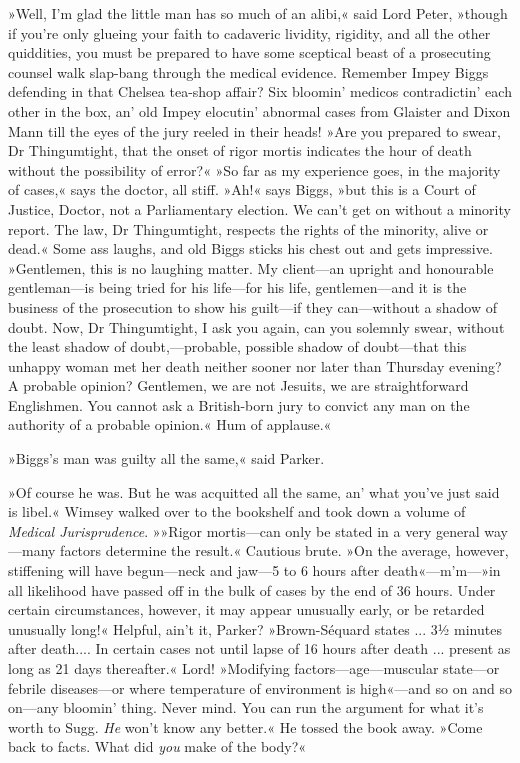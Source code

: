 »Well, I'm glad the little man has so much of an alibi,« said Lord Peter, »though if you're only glueing your faith to cadaveric lividity, rigidity, and all the other quiddities, you must be prepared to have some sceptical beast of a prosecuting counsel walk slap-bang through the medical evidence. Remember Impey Biggs defending in that Chelsea tea-shop affair? Six bloomin' medicos contradictin' each other in the box, an' old Impey elocutin' abnormal cases from Glaister and Dixon Mann till the eyes of the jury reeled in their heads! »Are you prepared to swear, Dr Thingumtight, that the onset of rigor mortis indicates the hour of death without the possibility of error?« »So far as my experience goes, in the majority of cases,« says the doctor, all stiff. »Ah!« says Biggs, »but this is a Court of Justice, Doctor, not a Parliamentary election. We can't get on without a minority report. The law, Dr Thingumtight, respects the rights of the minority, alive or dead.« Some ass laughs, and old Biggs sticks his chest out and gets impressive. »Gentlemen, this is no laughing matter. My client—an upright and honourable gentleman—is being tried for his life—for his life, gentlemen—and it is the business of the prosecution to show his guilt—if they can—without a shadow of doubt. Now, Dr Thingumtight, I ask you again, can you solemnly swear, without the least shadow of doubt,---probable, possible shadow of doubt—that this unhappy woman met her death neither sooner nor later than Thursday evening? A probable opinion? Gentlemen, we are not Jesuits, we are straightforward Englishmen. You cannot ask a British-born jury to convict any man on the authority of a probable opinion.« Hum of applause.«

»Biggs's man was guilty all the same,« said Parker.

»Of course he was. But he was acquitted all the same, an' what you've just said is libel.« Wimsey walked over to the bookshelf and took down a volume of \textit{Medical Jurisprudence}. »»Rigor mortis—can only be stated in a very general way—many factors determine the result.« Cautious brute. »On the average, however, stiffening will have begun—neck and jaw—5 to 6 hours after death«---m'm---»in all likelihood have passed off in the bulk of cases by the end of 36 hours. Under certain circumstances, however, it may appear unusually early, or be retarded unusually long!« Helpful, ain't it, Parker? »Brown-Séquard states ... 3½ minutes after death.... In certain cases not until lapse of 16 hours after death ... present as long as 21 days thereafter.« Lord! »Modifying factors—age---muscular state—or febrile diseases—or where temperature of environment is high«---and so on and so on—any bloomin' thing. Never mind. You can run the argument for what it's worth to Sugg. \textit{He} won't know any better.« He tossed the book away. »Come back to facts. What did \textit{you} make of the body?«

